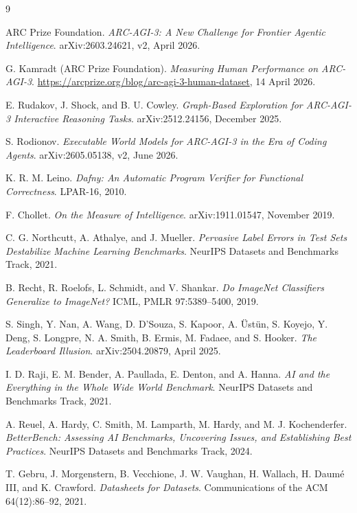 \documentclass[11pt]{article}
\begin{document}
\begin{thebibliography}{9}
\raggedright  %

ARC Prize Foundation.
\emph{ARC-AGI-3: A New Challenge for Frontier Agentic Intelligence}.
arXiv:2603.24621, v2, April 2026.

G. Kamradt (ARC Prize Foundation).
\emph{Measuring Human Performance on ARC-AGI-3}.
\url{https://arcprize.org/blog/arc-agi-3-human-dataset}, 14 April 2026.

E. Rudakov, J. Shock, and B. U. Cowley.
\emph{Graph-Based Exploration for ARC-AGI-3 Interactive Reasoning Tasks}.
arXiv:2512.24156, December 2025.

S. Rodionov.
\emph{Executable World Models for ARC-AGI-3 in the Era of Coding Agents}.
arXiv:2605.05138, v2, June 2026.

K. R. M. Leino.
\emph{Dafny: An Automatic Program Verifier for Functional Correctness}.
LPAR-16, 2010.

F. Chollet.
\emph{On the Measure of Intelligence}.
arXiv:1911.01547, November 2019.

C. G. Northcutt, A. Athalye, and J. Mueller.
\emph{Pervasive Label Errors in Test Sets Destabilize Machine Learning
Benchmarks}.
NeurIPS Datasets and Benchmarks Track, 2021.

B. Recht, R. Roelofs, L. Schmidt, and V. Shankar.
\emph{Do ImageNet Classifiers Generalize to ImageNet?}
ICML, PMLR 97:5389--5400, 2019.

S. Singh, Y. Nan, A. Wang, D. D'Souza, S. Kapoor, A. \"Ust\"un, S. Koyejo,
Y. Deng, S. Longpre, N. A. Smith, B. Ermis, M. Fadaee, and S. Hooker.
\emph{The Leaderboard Illusion}.
arXiv:2504.20879, April 2025.

I. D. Raji, E. M. Bender, A. Paullada, E. Denton, and A. Hanna.
\emph{AI and the Everything in the Whole Wide World Benchmark}.
NeurIPS Datasets and Benchmarks Track, 2021.

A. Reuel, A. Hardy, C. Smith, M. Lamparth, M. Hardy, and M. J. Kochenderfer.
\emph{BetterBench: Assessing AI Benchmarks, Uncovering Issues, and
Establishing Best Practices}.
NeurIPS Datasets and Benchmarks Track, 2024.

T. Gebru, J. Morgenstern, B. Vecchione, J. W. Vaughan, H. Wallach,
H. Daum\'e III, and K. Crawford.
\emph{Datasheets for Datasets}.
Communications of the ACM 64(12):86--92, 2021.


\end{thebibliography}
\end{document}
